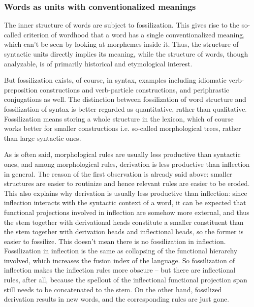 \documentclass[UTF8, a4paper, oneside, scheme=plain]{ctexart}
\begin{document}
\subsubsection{Words as units with conventionalized meanings}\label{sec:word-meaning}

The inner structure of words are subject to fossilization.
This gives rise to the so-called criterion of wordhood 
that a word has a single conventionalized meaning,
which can't be seen by looking at morphemes inside it.
Thus, the structure of syntactic units directly implies its meaning,
while the structure of words,
though analyzable,
is of primarily historical and etymological interest.

But fossilization exists, of course, in syntax,
examples including idiomatic verb-preposition constructions 
and verb-particle constructions,
and periphrastic conjugations as well.
The distinction between fossilization of word structure and fossilization of syntax 
is better regarded as quantitative, rather than qualitative.
Fossilization means storing a whole structure in the lexicon,
which of course works better for smaller constructions i.e. so-called morphological trees,
rather than large syntactic ones.

As is often said, morphological rules are usually less productive than syntactic ones,
and among morphological rules,
derivation is less productive than inflection in general.
The reason of the first observation is already said above:
smaller structures are easier to routinize 
and hence relevant rules are easier to be eroded.
This also explains why derivation is usually less productive than inflection:
since inflection interacts with the syntactic context of a word,
it can be expected that functional projections involved in inflection 
are somehow more external,
and thus the stem together with derivational heads 
constitute a smaller constituent than 
the stem together with derivation heads and inflectional heads,
so the former is easier to fossilize.
This doesn't mean there is no fossilization in inflection.
Fossilization in inflection is the same as collapsing of the functional hierarchy involved,
which increases the fusion index of the language.
So fossilization of inflection makes the inflection rules more obscure 
-- but there are inflectional rules, after all,
because the spellout of the inflectional functional projection span 
still needs to be concatenated to the stem.
On the other hand, 
fossilized derivation results in new words,
and the corresponding rules are just gone.
\end{document}
